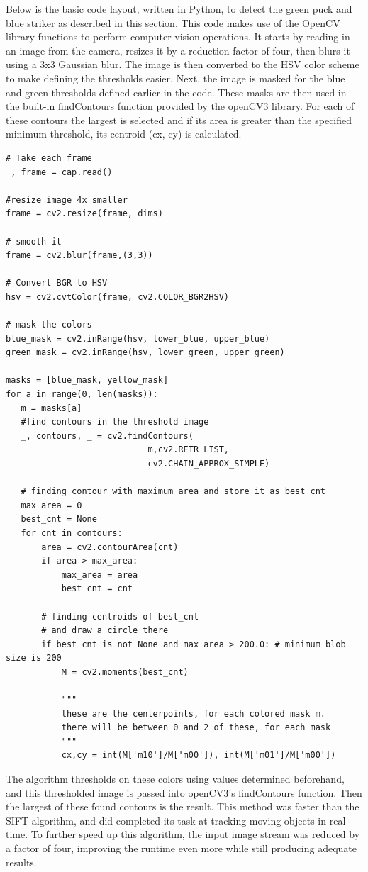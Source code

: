 \documentclass[letterpaper, 12 pt, conference]{ieeeconf}
\begin{document}
Below is the basic code layout, written in Python, to detect the green puck and blue striker as described in this section. This code makes use of the OpenCV library functions \cite{opencv} to perform computer vision operations. It starts by reading in an image from the camera, resizes it by a reduction factor of four, then blurs it using a 3x3 Gaussian blur. The image is then converted to the HSV color scheme to make defining the thresholds easier. Next, the image is masked for the blue and green thresholds defined earlier in the code. These masks are then used in the built-in findContours function provided by the openCV3 library. For each of these contours the largest is selected and if its area is greater than the specified minimum threshold, its centroid (cx, cy) is calculated.
\begin{lstlisting}
# Take each frame
_, frame = cap.read()

#resize image 4x smaller   
frame = cv2.resize(frame, dims)

# smooth it
frame = cv2.blur(frame,(3,3))

# Convert BGR to HSV
hsv = cv2.cvtColor(frame, cv2.COLOR_BGR2HSV)

# mask the colors
blue_mask = cv2.inRange(hsv, lower_blue, upper_blue)
green_mask = cv2.inRange(hsv, lower_green, upper_green)

masks = [blue_mask, yellow_mask]
for a in range(0, len(masks)):
   m = masks[a]
   #find contours in the threshold image
   _, contours, _ = cv2.findContours(
                            m,cv2.RETR_LIST,
                            cv2.CHAIN_APPROX_SIMPLE)

   # finding contour with maximum area and store it as best_cnt
   max_area = 0
   best_cnt = None
   for cnt in contours:
       area = cv2.contourArea(cnt)
       if area > max_area:
           max_area = area
           best_cnt = cnt

       # finding centroids of best_cnt
       # and draw a circle there
       if best_cnt is not None and max_area > 200.0: # minimum blob size is 200
           M = cv2.moments(best_cnt)

           """
           these are the centerpoints, for each colored mask m.
           there will be between 0 and 2 of these, for each mask
           """
           cx,cy = int(M['m10']/M['m00']), int(M['m01']/M['m00'])
\end{lstlisting}

The algorithm thresholds on these colors using values determined beforehand, and this thresholded image is passed into openCV3’s findContours function. Then the largest of these found contours is the result. This method was faster than the SIFT algorithm, and did completed its task at tracking moving objects in real time. To further speed up this algorithm, the input image stream was reduced by a factor of four, improving the runtime even more while still producing adequate results. 
\end{document}

